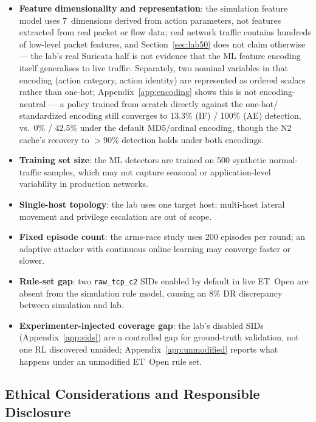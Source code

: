 \documentclass[sigconf]{acmart}
\begin{document}
\begin{itemize}
  \item \textbf{Feature dimensionality and representation}: the
    simulation feature model uses 7~dimensions derived from action
    parameters, not features extracted from real packet or flow data;
    real network traffic contains hundreds of low-level packet
    features, and Section~\ref{sec:lab50} does not claim otherwise ---
    the lab's real Suricata half is not evidence that the ML feature
    encoding itself generalises to live traffic. Separately, two
    nominal variables in that encoding (action category, action
    identity) are represented as ordered scalars rather than one-hot;
    Appendix~\ref{app:encoding} shows this is not encoding-neutral ---
    a policy trained from scratch directly against the one-hot/
    standardized encoding still converges to 13.3\% (IF) / 100\% (AE)
    detection, vs.\ 0\% / 42.5\% under the default MD5/ordinal
    encoding, though the N2 cache's recovery to $>$90\% detection
    holds under both encodings.
  \item \textbf{Training set size}: the ML detectors are trained on
    500 synthetic normal-traffic samples, which may not capture seasonal
    or application-level variability in production networks.
  \item \textbf{Single-host topology}: the lab uses one target host;
    multi-host lateral movement and privilege escalation are out of scope.
  \item \textbf{Fixed episode count}: the arms-race study uses 200
    episodes per round; an adaptive attacker with continuous online
    learning may converge faster or slower.
  \item \textbf{Rule-set gap}: two \texttt{raw\_tcp\_c2} SIDs enabled
    by default in live ET~Open are absent from the simulation rule model,
    causing an 8\% DR discrepancy between simulation and lab.
  \item \textbf{Experimenter-injected coverage gap}: the lab's disabled
    SIDs (Appendix~\ref{app:sids}) are a controlled gap for ground-truth
    validation, not one RL discovered unaided; Appendix~\ref{app:unmodified}
    reports what happens under an unmodified ET~Open rule set.
\end{itemize}

\subsection{Ethical Considerations and Responsible Disclosure}
\label{sec:disc:ethics}
\end{document}
